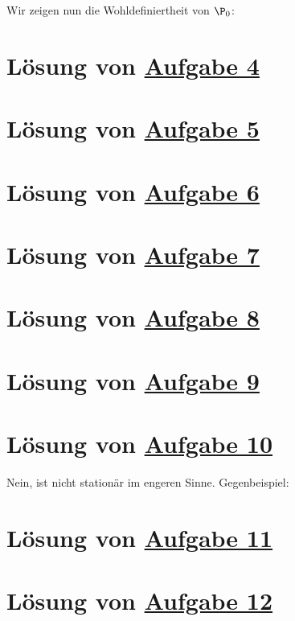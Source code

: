 Wir zeigen nun die Wohldefiniertheit von $\P_0$:

\section{Lösung von 
	\texorpdfstring{\hyperref[aufg:4]{Aufgabe 4}}{}
}\label{loes:4}

\section{Lösung von 
	\texorpdfstring{\hyperref[aufg:5]{Aufgabe 5}}{}
}\label{loes:5}

\section{Lösung von 
	\texorpdfstring{\hyperref[aufg:6]{Aufgabe 6}}{}
}\label{loes:6}

\section{Lösung von 
	\texorpdfstring{\hyperref[aufg:7]{Aufgabe 7}}{}
}\label{loes:7}

\section{Lösung von 
	\texorpdfstring{\hyperref[aufg:8]{Aufgabe 8}}{}
}\label{loes:8}

\section{Lösung von 
	\texorpdfstring{\hyperref[aufg:9]{Aufgabe 9}}{}
}\label{loes:9}

\section{Lösung von 
	\texorpdfstring{\hyperref[aufg:10]{Aufgabe 10}}{}
}\label{loes:10}

Nein, ist nicht stationär im engeren Sinne. Gegenbeispiel:

\section{Lösung von 
	\texorpdfstring{\hyperref[aufg:11]{Aufgabe 11}}{}
}\label{loes:11}


\section{Lösung von 
	\texorpdfstring{\hyperref[aufg:12]{Aufgabe 12}}{}
}\label{loes:12}

